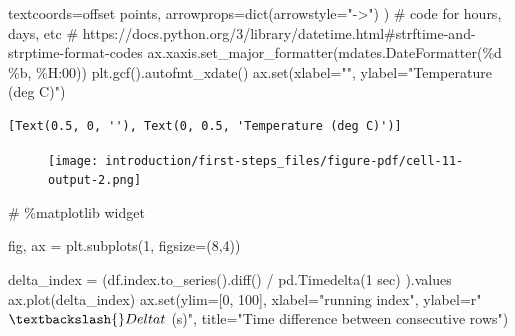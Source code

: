 \documentclass[
  letterpaper,
  DIV=11,
  numbers=noendperiod,
  oneside]{scrreprt}
\newenvironment{Shaded}{\begin{snugshade}}{\end{snugshade}}
\newcommand{\BuiltInTok}[1]{\textcolor[rgb]{0.00,0.23,0.31}{#1}}
\newcommand{\CommentTok}[1]{\textcolor[rgb]{0.37,0.37,0.37}{#1}}
\newcommand{\DecValTok}[1]{\textcolor[rgb]{0.68,0.00,0.00}{#1}}
\newcommand{\NormalTok}[1]{\textcolor[rgb]{0.00,0.23,0.31}{#1}}
\newcommand{\OperatorTok}[1]{\textcolor[rgb]{0.37,0.37,0.37}{#1}}
\newcommand{\SpecialCharTok}[1]{\textcolor[rgb]{0.37,0.37,0.37}{#1}}
\newcommand{\StringTok}[1]{\textcolor[rgb]{0.13,0.47,0.30}{#1}}
\newcommand{\VerbatimStringTok}[1]{\textcolor[rgb]{0.13,0.47,0.30}{#1}}
\begin{document}
\begin{Shaded}
\begin{Highlighting}[]
\NormalTok{            textcoords}\OperatorTok{=}\StringTok{\textquotesingle{}offset points\textquotesingle{}}\NormalTok{,}
\NormalTok{            arrowprops}\OperatorTok{=}\BuiltInTok{dict}\NormalTok{(arrowstyle}\OperatorTok{=}\StringTok{"{-}\textgreater{}"}\NormalTok{)}
\NormalTok{           )}
\CommentTok{\# code for hours, days, etc}
\CommentTok{\# https://docs.python.org/3/library/datetime.html\#strftime{-}and{-}strptime{-}format{-}codes}
\NormalTok{ax.xaxis.set\_major\_formatter(mdates.DateFormatter(}\StringTok{\textquotesingle{}}\SpecialCharTok{\%d}\StringTok{ \%b, \%H:00\textquotesingle{}}\NormalTok{))}
\NormalTok{plt.gcf().autofmt\_xdate()}
\NormalTok{ax.}\BuiltInTok{set}\NormalTok{(xlabel}\OperatorTok{=}\StringTok{""}\NormalTok{,}
\NormalTok{       ylabel}\OperatorTok{=}\StringTok{"Temperature (deg C)"}\NormalTok{)}
\end{Highlighting}
\end{Shaded}

\begin{verbatim}
[Text(0.5, 0, ''), Text(0, 0.5, 'Temperature (deg C)')]
\end{verbatim}

\begin{figure}[H]

{\centering \texttt{[image: introduction/first-steps\_files/figure-pdf/cell-11-output-2.png]}

}

\end{figure}

\begin{Shaded}
\begin{Highlighting}[]
\CommentTok{\# \%matplotlib widget}

\NormalTok{fig, ax }\OperatorTok{=}\NormalTok{ plt.subplots(}\DecValTok{1}\NormalTok{, figsize}\OperatorTok{=}\NormalTok{(}\DecValTok{8}\NormalTok{,}\DecValTok{4}\NormalTok{))}

\NormalTok{delta\_index }\OperatorTok{=}\NormalTok{ (df.index.to\_series().diff() }\OperatorTok{/}\NormalTok{ pd.Timedelta(}\StringTok{\textquotesingle{}1 sec\textquotesingle{}}\NormalTok{) ).values}
\NormalTok{ax.plot(delta\_index)}
\NormalTok{ax.}\BuiltInTok{set}\NormalTok{(ylim}\OperatorTok{=}\NormalTok{[}\DecValTok{0}\NormalTok{, }\DecValTok{100}\NormalTok{],}
\NormalTok{       xlabel}\OperatorTok{=}\StringTok{"running index"}\NormalTok{,}
\NormalTok{       ylabel}\OperatorTok{=}\VerbatimStringTok{r"$\textbackslash{}Delta t$ (s)"}\NormalTok{,}
\NormalTok{       title}\OperatorTok{=}\StringTok{"Time difference between consecutive rows"}\NormalTok{)}
\end{Highlighting}
\end{Shaded}
\end{document}
